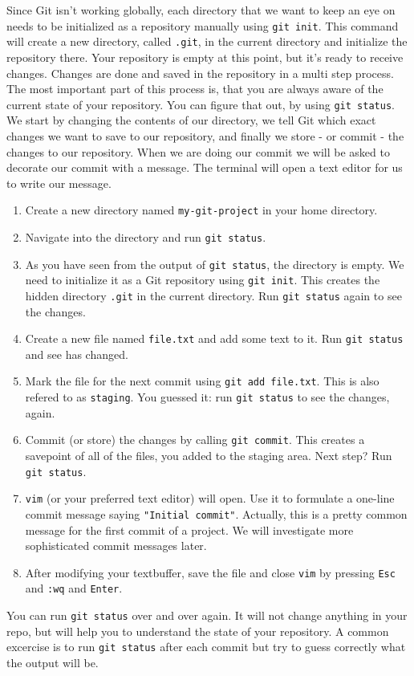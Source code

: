 \begin{challenge}
    \begin{task}
        Since Git isn't working globally, each directory that we want to keep an eye on needs to be initialized as a repository manually using \texttt{git init}.
        This command will create a new directory, called \texttt{.git}, in the current directory and initialize the repository there.
        Your repository is empty at this point, but it's ready to receive changes.
        Changes are done and saved in the repository in a multi step process.
        The most important part of this process is, that you are always aware of the current state of your repository.
        You can figure that out, by using \texttt{git status}.
        We start by changing the contents of our directory, we tell Git which exact changes we want to save to our repository, and finally we store - or commit - the changes to our repository.
        When we are doing our commit we will be asked to decorate our commit with a message.
        The terminal will open a text editor for us to write our message.
        
        \begin{enumerate}
            \item Create a new directory named \texttt{my-git-project} in your home directory.
            \item Navigate into the directory and run \texttt{git status}.
            \item As you have seen from the output of \texttt{git status}, the directory is empty. We need to initialize it as a Git repository using \texttt{git init}. This creates the hidden directory \texttt{.git} in the current directory. Run \texttt{git status} again to see the changes.
            \item Create a new file named \texttt{file.txt} and add some text to it. Run \texttt{git status} and see has changed.
            \item Mark the file for the next commit using \texttt{git add file.txt}. This is also refered to as \texttt{staging}. You guessed it: run \texttt{git status} to see the changes, again. 
            \item Commit (or store) the changes by calling \texttt{git commit}. This creates a savepoint of all of the files, you added to the staging area. Next step? Run \texttt{git status}.
            \item \texttt{vim} (or your preferred text editor) will open. Use it to formulate a one-line commit message saying \texttt{"Initial commit"}. Actually, this is a pretty common message for the first commit of a project. We will investigate more sophisticated commit messages later.
            \item After modifying your textbuffer, save the file and close \texttt{vim} by pressing \texttt{Esc} and \texttt{:wq} and \texttt{Enter}.
        \end{enumerate}
        You can run \texttt{git status} over and over again. 
        It will not change anything in your repo, but will help you to understand the state of your repository.
        A common excercise is to run \texttt{git status} after each commit but try to guess correctly what the output will be.


\end{task}
\end{challenge}
